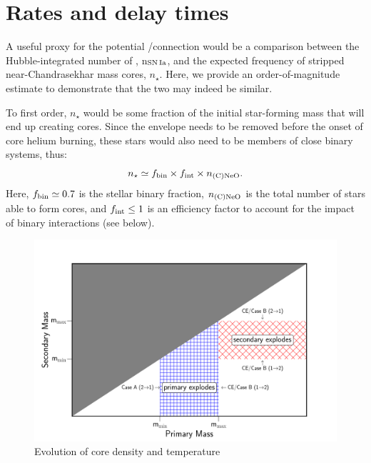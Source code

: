 \documentclass[twocolumn,tighten,times]{aastex62}
\begin{document}
\section{Rates and delay times}\label{sec:4}
A useful proxy for the potential \one/\ia connection would be a comparison between 
the  Hubble-integrated number of \ias, n$_{\rm SN\,Ia}$, and the expected frequency  of stripped  near-Chandrasekhar mass \one cores, $n_\star$. Here, we provide an
order-of-magnitude estimate to demonstrate that the two may indeed be similar. 

To first order, $n_\star$ would be some fraction of the initial star-forming mass that will end up creating    \one cores. Since the  envelope needs to be removed before the onset of core helium burning, these stars would also need to be members of close  binary systems, thus:  
\begin{equation}
n_{\star} \simeq  f_{\rm bin} \times f_{\rm int} \times  n_{\rm \one}.
\end{equation}
Here, $f_{\rm bin}\simeq 0.7$ \citep{Sana:2012px} is the stellar binary fraction,   $n_{\rm \one}$ is the total 
number of stars able to form \one cores, and $f_{\rm int}\leq 1$ is an efficiency factor to account for the impact of binary interactions (see below).
\begin{figure}[htb!]
\begin{center}
\includegraphics[width=1\textwidth]{rates.pdf}
\caption{Evolution of core density and temperature }
\label{fig:rates}
\end{center}
\end{figure}
\end{document}
